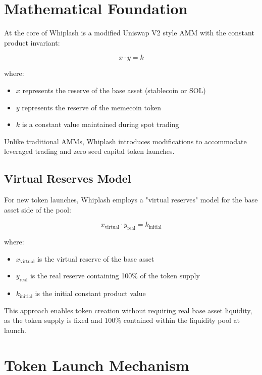 \documentclass[11pt]{article}
\begin{document}
\section{Mathematical Foundation}

At the core of Whiplash is a modified Uniswap V2 style AMM with the constant product invariant:

\begin{equation}
x \cdot y = k
\end{equation}

where:
\begin{itemize}
    \item $x$ represents the reserve of the base asset (stablecoin or SOL)
    \item $y$ represents the reserve of the memecoin token
    \item $k$ is a constant value maintained during spot trading
\end{itemize}

Unlike traditional AMMs, Whiplash introduces modifications to accommodate leveraged trading and zero seed capital token launches.

\subsection{Virtual Reserves Model}

For new token launches, Whiplash employs a "virtual reserves" model for the base asset side of the pool:

\begin{equation}
x_{\text{virtual}} \cdot y_{\text{real}} = k_{\text{initial}}
\end{equation}

where:
\begin{itemize}
    \item $x_{\text{virtual}}$ is the virtual reserve of the base asset
    \item $y_{\text{real}}$ is the real reserve containing 100\% of the token supply
    \item $k_{\text{initial}}$ is the initial constant product value
\end{itemize}

This approach enables token creation without requiring real base asset liquidity, as the token supply is fixed and 100\% contained within the liquidity pool at launch.

\section{Token Launch Mechanism}
\end{document}
